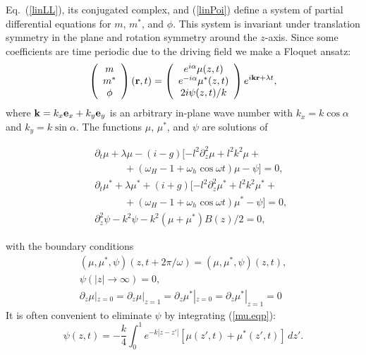 Eq.~(\ref{linLL}), its conjugated complex, and (\ref{linPoi}) define
a system of partial differential equations for $m$, $m^*$, and
$\phi$.  This system is invariant under translation symmetry in the
plane and rotation symmetry around the $z$-axis. Since some
coefficients are time periodic due to the driving field we make a
Floquet ansatz:
\begin{equation}
  \left(\begin{array}{c}m\\m^*\\\phi\end{array}\right)({\bf r},t)=
  \left(\begin{array}{c}e^{i\alpha}\mu(z,t)\\e^{-i\alpha}\mu^*(z,t)\\
   2i\psi(z,t)/k\end{array}\right)e^{i{\bf k}{\bf r}+\lambda t},
  \label{lin.sol}
\end{equation}
where ${\bf k}=k_x{\bf e}_x+k_y{\bf e}_y$ is an arbitrary in-plane
wave number with $k_x=k\cos\alpha$ and $k_y=k\sin\alpha$. The
functions $\mu$, $\mu^*$, and $\psi$ are solutions of
\begin{mathletters}
\label{mu.eq}
\begin{eqnarray}
   &&\partial_t\mu+\lambda\mu-(i-g)[-l^2\partial_z^2\mu+l^2k^2\mu+
   \nonumber\\&&\hspace{3em}+(\omega_H-1+\omega_h\cos\omega t)\mu-
   \psi]=0,
   \label{mu.eqm}\\
   &&\partial_t\mu^*+\lambda\mu^*+(i+g)[-l^2\partial_z^2\mu^*+l^2
   k^2\mu^*+\nonumber\\&&\hspace{3em}+(\omega_H-1+\omega_h\cos\omega
   t)\mu^*-\psi]=0,
   \label{mu.eqms}\\
   &&\partial_z^2\psi-k^2\psi-k^2(\mu+\mu^*)B(z)/2=0,\label{mu.eqp}
\end{eqnarray}
\end{mathletters}
with the boundary conditions
\begin{equation}\begin{array}{c}
  (\mu,\mu^*,\psi)(z,t+2\pi/\omega)=(\mu,\mu^*,\psi)(z,t),\\
  \psi(|z|\to\infty)=0,\\
  \partial_z\mu|_{z=0}=\partial_z\mu|_{z=1}=
  \partial_z\mu^*|_{z=0}=\partial_z\mu^*|_{z=1}=0
\end{array}
  \label{mu.bc}
\end{equation}
It is often convenient to eliminate $\psi$ by integrating
(\ref{mu.eqp}):
\begin{equation}
  \psi(z,t)=-\frac{k}{4}\int_0^1e^{-k|z-z'|}[\mu(z',t)+\mu^*(z',t)]
   \,dz'.
  \label{psi.eq}
\end{equation}

